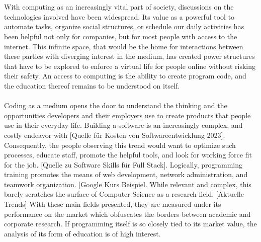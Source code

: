 \section{}
With computing as an increasingly vital part of society, discussions on the technologies involved have been widespread. Its value as a powerful tool to automate tasks, organize social structures, or schedule our daily activities has been helpful not only for companies, but for most people with access to the internet. This infinite space, that would be the home for interactions between these parties with diverging interest in the medium, has created power structures that have to be explored to enforce a virtual life for people online without risking their safety. An access to computing is the ability to create program code, and the education thereof remains to be understood on itself. \\ \\
Coding as a medium opens the door to understand the thinking and the opportunities developers and their employers use to create products that people use in their everyday life. Building a software is an increasingly complex, and costly endeavor with [Quelle für Kosten von Softwareentwicklung 2023]. Consequently, the people observing this trend would want to optimize such processes, educate staff, promote the helpful tools, and look for working force fit for the job. [Quelle zu Software Skills für Full Stack]. Logically, programming training promotes the means of web development, network administration, and teamwork organization. [Google Kurs Beispiel. While relevant and complex, this barely scratches the surface of Computer Science as a research field. [Aktuelle Trends] With these main fields presented, they are measured under its performance on the market which obfuscates the borders between academic and corporate research. If programming itself is so closely tied to its market value, the analysis of its form of education is of high interest. \\ \\
